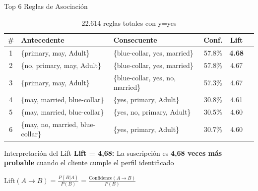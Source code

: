 \documentclass[10pt]{beamer}
\begin{document}
\begin{frame}{Top 6 Reglas de Asociación}
    \begin{table}[h]
        \centering
        \tiny
        \begin{tabular}{clp{4cm}ccc}
            \toprule
            \textbf{\#} & \textbf{Antecedente} & \textbf{Consecuente} & \textbf{Conf.} & \textbf{Lift} \\
            \midrule
            1 & \{primary, may, Adult\} & \{blue-collar, yes, married\} & 57.8\% & \textbf{4.68} \\
            2 & \{no, primary, may, Adult\} & \{blue-collar, yes, married\} & 57.8\% & 4.67 \\
            3 & \{primary, may, Adult\} & \{blue-collar, yes, no, married\} & 57.3\% & 4.67 \\
            4 & \{may, married, blue-collar\} & \{yes, primary, Adult\} & 30.8\% & 4.61 \\
            5 & \{may, married, blue-collar\} & \{yes, no, primary, Adult\} & 30.5\% & 4.60 \\
            6 & \{may, no, married, blue-collar\} & \{yes, primary, Adult\} & 30.7\% & 4.60 \\
            \bottomrule
        \end{tabular}
        \caption{\scriptsize 22.614 reglas totales con y=yes}
    \end{table}
    
    \vspace{0.2cm}
    \begin{block}{Interpretación del Lift}
        \textbf{Lift = 4,68:} La suscripción es \textbf{4,68 veces más probable} cuando el cliente cumple el perfil identificado
        
        \vspace{0.1cm}
        $\text{Lift}(A \rightarrow B) = \frac{P(B|A)}{P(B)} = \frac{\text{Confidence}(A \rightarrow B)}{P(B)}$
    \end{block}
\end{frame}
\end{document}
